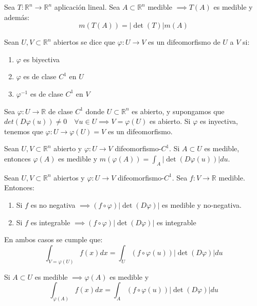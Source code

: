 \begin{teorema}
    Sea $T: \mathbb{R}^n \to \mathbb{R}^n$ aplicación lineal. Sea $A \subset \mathbb{R}^n$ medible $\implies T(A)$ es medible y además:
    \[m(T(A)) = |\det(T)|m(A)\]
\end{teorema}
\begin{definición} 
Sean $U, V \subset \mathbb{R}^n$ abiertos se dice que $\varphi: U \to V$ es un difeomorfismo de $U$ a $V$ si:
\vspace{-0.5em}
\begin{enumerate}
    \item $\varphi$ es biyectiva
    \item $\varphi$ es de clase $C^1$ en $U$
    \item $\varphi^{-1}$ es de clase $C^1$ en $V$
\end{enumerate}
\end{definición}
\begin{observación}
Sea $\varphi: U \to \mathbb{R}$ de clase $C^1$ donde $U \subset \mathbb{R}^n$ es abierto, y supongamos que $det(D\varphi(u)) \neq 0 \quad \forall u \in U \implies V = \varphi(U)$ es abierto. Si $\varphi$ es inyectiva, tenemos que $\varphi: U \to \varphi(U) = V$ es un difeomorfismo.
\end{observación}

\begin{teorema}
    Sean $U, V \subset \mathbb{R}^n$ abierto y $\varphi: U \to V$ difeomorfismo-$C^{1}$. Si $A \subset U$ es medible, entonces $\varphi(A)$ es medible y $m(\varphi(A)) = \int_{A}|\det(D\varphi(u))|du$.
\end{teorema}

\begin{teorema}
    Sean $U,V \subset \mathbb{R}^n$ abiertos y $\varphi: U \to V$ difeomorfismo-$C^1$. Sea $f: V \to \mathbb{R}$ medible. Entonces:
    \begin{enumerate}
        \item Si $f$ es no negativa $\implies (f \circ \varphi) |\det(D\varphi)|$ es medible
              y no-negativa.
        \item Si $f$ es integrable $\implies (f \circ \varphi)|\det(D\varphi)|$ es integrable \end{enumerate}
    En ambos casos se cumple que:
    $$\int_{V = \varphi(U)} f(x)dx = \int_U (f \circ \varphi(u))|\det(D\varphi)|du$$
\end{teorema}
\begin{observación}
Si $A \subset U$ es medible $\implies \varphi(A)$ es medible y
$$\int_{\varphi(A)}f(x)dx = \int_{A}(f \circ \varphi(u))|\det(D\varphi)|du$$
\end{observación}

